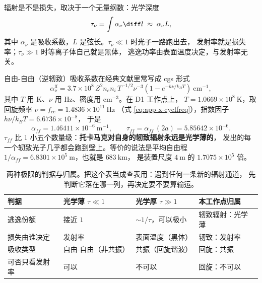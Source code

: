 辐射是不是损失，取决于一个无量纲数：光学深度
\begin{equation}
\tau_\nu = \int \alpha_\nu \diff l \;\approx\; \alpha_\nu L,
\label{eq:app-x-optdepth}
\end{equation}
其中 $\alpha_\nu$ 是吸收系数，$L$ 是弦长。$\tau_\nu\ll1$ 时光子一路跑出去，
发射率就是损失率；$\tau_\nu\gg1$ 时等离子体自己就是黑体，
逃逸功率由表面温度决定，与发射率无关。

自由-自由（逆轫致）吸收系数在经典文献里常写成 cgs 形式
\begin{equation}
\alpha_\nu^{\mathrm{ff}} = 3.7\times10^{8}\,
Z^2 n_e n_i\,T^{-1/2}\nu^{-3}
\left(1-e^{-h\nu/k_BT}\right)\ \mathrm{cm^{-1}},
\label{eq:app-x-ffabs}
\end{equation}
其中 $T$ 用 K、$\nu$ 用 Hz、密度用 $\mathrm{cm^{-3}}$。在 D1 工作点上，
$T=1.0669\times10^{8}\ \mathrm{K}$，取回旋频率 $\nu=f_{ce}=1.4836\times10^{11}\ \mathrm{Hz}$
（式 \eqref{eq:app-x-cyclfreq}），指数因子 $h\nu/k_BT=6.6736\times10^{-8}$，
于是
\begin{equation}
\alpha_{ff} = 1.46411\times10^{-6}\ \mathrm{m^{-1}},
\qquad
\tau_{ff} = \alpha_{ff}\,(2a) = 5.85642\times10^{-6}.
\label{eq:app-x-tauff}
\end{equation}
$\tau_{ff}$ 比 $1$ 小五个数量级：\textbf{托卡马克对自身的轫致辐射永远是光学薄的}，
发出的每一个轫致光子几乎都会跑到壁上。等价的说法是平均自由程
$1/\alpha_{ff}=6.8301\times10^{5}\ \mathrm{m}$，也就是 $683\ \mathrm{km}$，
是装置尺度 $4\ \mathrm{m}$ 的 $1.7075\times10^{5}$ 倍。

\begin{table}[htbp]
\centering
\small
\caption{两种极限的判据与归属。把这个表当成查表用：遇到任何一条新的辐射通道，
先判断它落在哪一列，再决定要不要算输运。}
\label{tab:app-x-opacity}
\begin{tabular}{p{2.6cm}p{3.4cm}p{3.4cm}p{3.2cm}}
\toprule
判据 & 光学薄 $\tau\ll1$ & 光学厚 $\tau\gg1$ & 本工作点归属 \\
\midrule
逃逸份额 & 接近 $1$ & $\sim1/\tau$，可以极小 & 轫致辐射：光学薄 \\
损失由谁决定 & 发射率 & 表面温度（黑体） & 轫致：发射率 \\
吸收类型 & 自由-自由（非共振） & 共振（回旋谐波） & 回旋：共振 \\
可否只看发射率 & 可以 & 不可以 & 回旋：不可以 \\
\bottomrule
\end{tabular}

\end{table}

